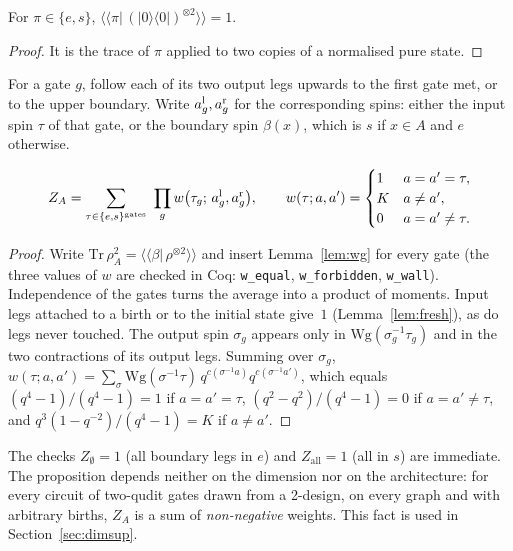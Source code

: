 \begin{lemma}\label{lem:fresh}
For $\pi\in\{e,s\}$, $\langle\!\langle\pi|\,(|0\rangle\langle0|)^{\otimes2}\rangle\!\rangle=1$.
\end{lemma}
\begin{proof}
It is the trace of $\pi$ applied to two copies of a normalised pure state.
\end{proof}

For a gate $g$, follow each of its two output legs upwards to the first gate met, or to the upper boundary. Write $a_g^{\rm l},a_g^{\rm r}$ for the corresponding spins: either the input spin $\tau$ of that gate, or the boundary spin $\beta(x)$, which is $s$ if $x\in A$ and $e$ otherwise.

\begin{proposition}\label{prop:gauge}
\begin{equation}\label{eq:gauge}
Z_A=\sum_{\tau\in\{e,s\}^{\text{gates}}}\ \prod_g w\bigl(\tau_g;\,a_g^{\rm l},a_g^{\rm r}\bigr),\qquad
w(\tau;a,a')=\begin{cases}1 & a=a'=\tau,\\ K & a\ne a',\\ 0 & a=a'\ne\tau.\end{cases}
\end{equation}
\end{proposition}
\begin{proof}
Write $\mathrm{Tr}\,\rho_A^2=\langle\!\langle\beta|\,\rho^{\otimes2}\rangle\!\rangle$ and insert Lemma~\ref{lem:wg} for every gate (the three values of $w$ are checked in Coq: \texttt{w\_equal}, \texttt{w\_forbidden}, \texttt{w\_wall}). Independence of the gates turns the average into a product of moments. Input legs attached to a birth or to the initial state give~$1$ (Lemma~\ref{lem:fresh}), as do legs never touched. The output spin $\sigma_g$ appears only in $\mathrm{Wg}(\sigma_g^{-1}\tau_g)$ and in the two contractions of its output legs. Summing over $\sigma_g$, $w(\tau;a,a')=\sum_\sigma \mathrm{Wg}(\sigma^{-1}\tau)\,q^{c(\sigma^{-1}a)}q^{c(\sigma^{-1}a')}$, which equals $(q^4-1)/(q^4-1)=1$ if $a=a'=\tau$, $(q^2-q^2)/(q^4-1)=0$ if $a=a'\neq\tau$, and $q^3(1-q^{-2})/(q^4-1)=K$ if $a\ne a'$.
\end{proof}

The checks $Z_\emptyset=1$ (all boundary legs in $e$) and $Z_{\text{all}}=1$ (all in $s$) are immediate. The proposition depends neither on the dimension nor on the architecture: for every circuit of two-qudit gates drawn from a 2-design, on every graph and with arbitrary births, $Z_A$ is a sum of \emph{non-negative} weights. This fact is used in Section~\ref{sec:dimsup}.

